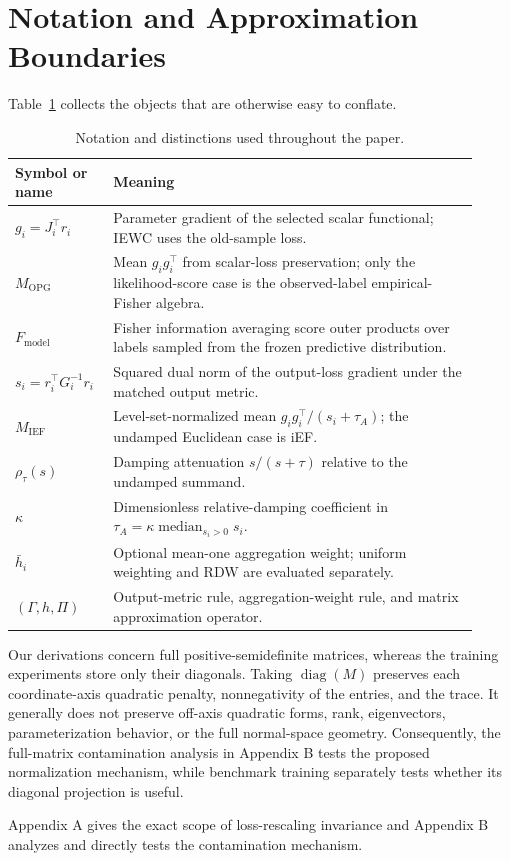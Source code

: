 \section{Notation and Approximation Boundaries}

Table~\ref{tab:notation} collects the objects that are otherwise easy to conflate.

\begin{table}[t]
\caption{Notation and distinctions used throughout the paper.}
\label{tab:notation}
\centering
\small
\begin{tabular}{p{0.18\linewidth}p{0.74\linewidth}}
\toprule
Symbol or name & Meaning \\
\midrule
$g_i=J_i^\top r_i$ & Parameter gradient of the selected scalar functional; IEWC uses the old-sample loss. \\
$M_{\mathrm{OPG}}$ & Mean $g_i g_i^\top$ from scalar-loss preservation; only the likelihood-score case is the observed-label empirical-Fisher algebra. \\
$F_{\mathrm{model}}$ & Fisher information averaging score outer products over labels sampled from the frozen predictive distribution. \\
$s_i=r_i^\top G_i^{-1}r_i$ & Squared dual norm of the output-loss gradient under the matched output metric. \\
$M_{\mathrm{IEF}}$ & Level-set-normalized mean $g_i g_i^\top/(s_i+\tau_A)$; the undamped Euclidean case is iEF. \\
$\rho_\tau(s)$ & Damping attenuation $s/(s+\tau)$ relative to the undamped summand. \\
$\kappa$ & Dimensionless relative-damping coefficient in $\tau_A=\kappa\operatorname{median}_{s_i>0}s_i$. \\
$\bar h_i$ & Optional mean-one aggregation weight; uniform weighting and RDW are evaluated separately. \\
$(\Gamma,h,\Pi)$ & Output-metric rule, aggregation-weight rule, and matrix approximation operator. \\
\bottomrule
\end{tabular}
\end{table}

Our derivations concern full positive-semidefinite matrices, whereas the training experiments store only their diagonals. Taking $\operatorname{diag}(M)$ preserves each coordinate-axis quadratic penalty, nonnegativity of the entries, and the trace. It generally does not preserve off-axis quadratic forms, rank, eigenvectors, parameterization behavior, or the full normal-space geometry. Consequently, the full-matrix contamination analysis in Appendix B tests the proposed normalization mechanism, while benchmark training separately tests whether its diagonal projection is useful.

Appendix A gives the exact scope of loss-rescaling invariance and Appendix B analyzes and directly tests the contamination mechanism.
